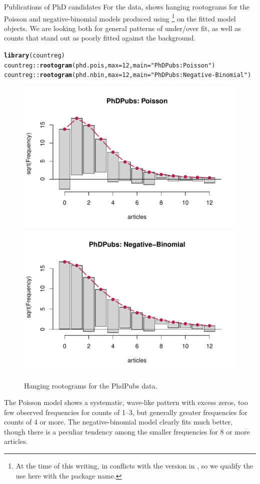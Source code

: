 \documentclass[11pt]{book}\usepackage[]{graphicx}\usepackage[]{color}
\makeatletter
\newcommand{\hlnum}[1]{\textcolor[rgb]{0.686,0.059,0.569}{#1}}%
\newcommand{\hlstr}[1]{\textcolor[rgb]{0.192,0.494,0.8}{#1}}%
\newcommand{\hlstd}[1]{\textcolor[rgb]{0.345,0.345,0.345}{#1}}%
\newcommand{\hlkwc}[1]{\textcolor[rgb]{0.333,0.667,0.333}{#1}}%
\newcommand{\hlkwd}[1]{\textcolor[rgb]{0.737,0.353,0.396}{\textbf{#1}}}%
\newenvironment{kframe}{%
 \def\at@end@of@kframe{}%
 \ifinner\ifhmode%
  \def\at@end@of@kframe{\end{minipage}}%
  \begin{minipage}{\columnwidth}%
 \fi\fi%
 \def\FrameCommand##1{\hskip\@totalleftmargin \hskip-\fboxsep
 \colorbox{shadecolor}{##1}\hskip-\fboxsep
     \hskip-\linewidth \hskip-\@totalleftmargin \hskip\columnwidth}%
 \MakeFramed {\advance\hsize-\width
   \@totalleftmargin\z@ \linewidth\hsize
   \@setminipage}}%
 {\par\unskip\endMakeFramed%
 \at@end@of@kframe}
\newenvironment{knitrout}{}{} %
\renewenvironment{knitrout}{\small\renewcommand{\baselinestretch}{.85}}{} %
\makeatother
\begin{document}
\begin{Example}[phdpubs4]{Publications of PhD candidates}
For the  data,  shows hanging rootograms for the
Poisson and negative-binomial models produced using %
\footnote{
At the time of this writing,  in  conflicts with
the version in , so we qualify the use here with the package name.
}
on the fitted model objects.  We are looking both for general patterns of under/over fit, as well
as counts that stand out as poorly fitted against the background.

\begin{knitrout}
\color{fgcolor}\begin{kframe}
\begin{alltt}
\hlkwd{library}\hlstd{(countreg)}
\hlstd{countreg::}\hlkwd{rootogram}\hlstd{(phd.pois,} \hlkwc{max}\hlstd{=}\hlnum{12}\hlstd{,} \hlkwc{main}\hlstd{=}\hlstr{"PhDPubs: Poisson"}\hlstd{)}
\hlstd{countreg::}\hlkwd{rootogram}\hlstd{(phd.nbin,} \hlkwc{max}\hlstd{=}\hlnum{12}\hlstd{,} \hlkwc{main}\hlstd{=}\hlstr{"PhDPubs: Negative-Binomial"}\hlstd{)}
\end{alltt}
\end{kframe}\begin{figure}[!htbp]


\centerline{\includegraphics[width=.49\textwidth]{ch09/fig/phdpubs4-rootogram1} 
\includegraphics[width=.49\textwidth]{ch09/fig/phdpubs4-rootogram2} }

\caption[Hanging rootograms for the PhdPubs data]{Hanging rootograms for the PhdPubs data.\label{fig:phdpubs4-rootogram}}
\end{figure}


\end{knitrout}
The Poisson model shows a systematic, wave-like pattern with excess zeros, too few observed frequencies for
counts of
1--3, but generally greater frequencies for counts of 4 or more.  The negative-binomial model
clearly fits much better, though there is a peculiar tendency among the smaller
frequencies for 8 or more articles.
\end{Example}
\end{document}
